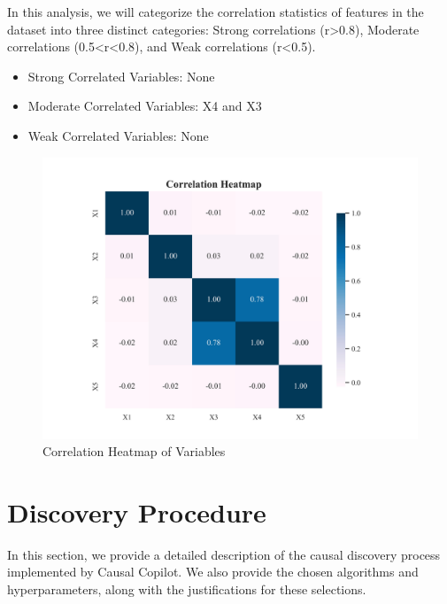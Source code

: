\documentclass{article}
\begin{document}
\begin{minipage}[t]{0.5\linewidth}
    In this analysis, we will categorize the correlation statistics of features in the dataset into three distinct categories: Strong correlations (r>0.8), Moderate correlations (0.5<r<0.8), and Weak correlations (r<0.5).

\begin{itemize}
\item Strong Correlated Variables: None
\item Moderate Correlated Variables: X4 and X3
\item Weak Correlated Variables: None
\end{itemize}
\vfill
\end{minipage}
\hfill
\begin{minipage}[t]{0.5\linewidth}
    \begin{figure}[H]
        \centering
        \vspace{-1.5cm}
        \includegraphics[width=\linewidth]{./demo_data/20241104_155654/Linear_Nongaussian_data/output_graph/eda_corr.jpg}
        \caption{\label{fig:corr}Correlation Heatmap of Variables}
    \end{figure}
\end{minipage}

\section{Discovery Procedure}

In this section, we provide a detailed description of the causal discovery process implemented by Causal Copilot. 
We also provide the chosen algorithms and hyperparameters, along with the justifications for these selections.
\end{document}
